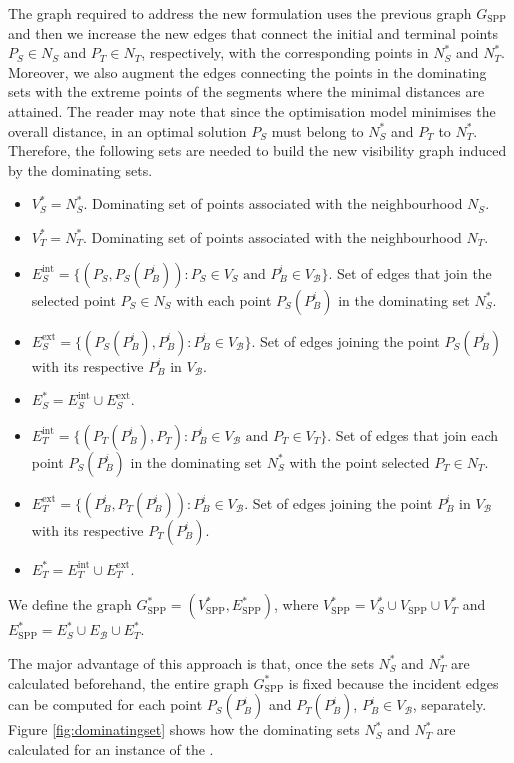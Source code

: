 \documentclass[a4paper,  review, authoryear, 1p.]{elsarticle}
\newcommand{\SPPN}{{\sf{H-SPPN}\xspace }}
\newcommand{\VB}{{V^{}_{\mathcal B}}}
\newcommand{\EB}{{E^{}_{\mathcal B}}}
\newcommand{\VS}{{V^{}_{S}}}
\newcommand{\VT}{{V^{}_{T}}}
\newcommand{\GSPP}{{G_{\text{SPP}}}}
\newcommand{\VSPP}{{V_{\text{SPP}}}}
\newcommand{\GSPPS}{{G^{*}_{\text{SPP}}}}
\newcommand{\VSPPS}{{V^{*}_{\text{SPP}}}}
\newcommand{\ESPPS}{{E^{*}_{\text{SPP}}}}
\newcommand{\CV}[1]{{\color{red}#1}}
\begin{document}
	The graph required to address the new formulation uses the previous graph $\GSPP$ and then we increase the new edges that connect the initial and terminal points $P_S\in N_S$ and $P_T\in N_T$, respectively, with the corresponding points in $N_S^*$ and $N_T^*$. Moreover, we also augment the edges connecting the points in the dominating sets with the extreme points of the segments where the minimal distances are attained. The reader may note that since the optimisation model minimises the overall distance, in an optimal solution $P_S$ must belong to $N_S^*$ and $P_T$ to $N_T^*$.
	Therefore, the following sets are needed to build the new \CV{visibility} graph induced by the dominating sets.
	\begin{itemize}
		\item $V_S^*=N^*_S$. Dominating set of points associated with the neighbourhood $N_S$.
		\item $V_T^*=N^*_T$. Dominating set of points associated with the neighbourhood $N_T$.
		\item $E^\text{int}_S=\{(P_S, P_S(P_B^i)):P_S\in\VS\text{ and }P_B^i\in \VB\}$. Set of edges that join the selected point $P_S\in N_S$ with each point $P_S(P_B^i)$ in the dominating set $N^*_S$.
		\item $E^\text{ext}_S=\{(P_S(P_B^i), P_B^i):P_B^i\in\VB\}$. Set of edges joining the point $P_S(P_B^i)$ with its respective $P_B^i$ in $\VB$. 
		\item $E^*_S=E^\text{int}_S\cup E^\text{ext}_S.$
		\item $E^\text{int}_T=\{(P_T(P_B^i), P_T):P_B^i\in \VB\text{ and }P_T\in\VT\}$. Set of edges that join each point $P_S(P_B^i)$ in the dominating set $N^*_S$ with the point selected $P_T\in N_T$. 
		\item $E^\text{ext}_T=\{(P_B^i, P_T(P_B^i)):P_B^i\in\VB$. Set of edges joining the point $P_B^i$ in $\VB$ with its respective $P_T(P_B^i)$. 
		\item $E^*_T=E^\text{int}_T\cup E^\text{ext}_T.$
	\end{itemize}
	We define the graph $\GSPPS=(\VSPPS, \ESPPS)$, where $\VSPPS=V^*_S\cup\VSPP\cup V^*_T$ and $\ESPPS=E^*_S\cup\EB\cup E^*_T.$
	
	
	The major advantage of this approach is that, once the sets $N_S^*$ and $N_T^*$ are calculated beforehand, the entire graph $\GSPPS$ is fixed because the incident edges can be computed for each point $P_S(P_B^i)$ and $P_T(P_B^i)$, $P_B^i\in V_{\mathcal B}$, separately. Figure \ref{fig:dominatingset} shows how the dominating sets $N_S^*$ and $N_T^*$ are calculated for an instance of the \SPPN.
	
\end{document}
